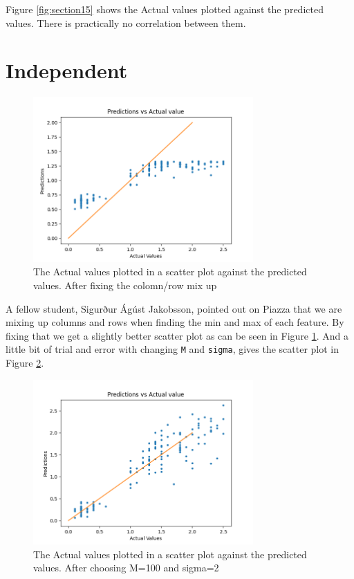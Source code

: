 \documentclass{article}
\begin{document}
Figure \ref{fig:section15} shows the Actual values plotted against the predicted values. There is practically no correlation between them. 

\section*{Independent}
\begin{figure}[H]
    \centering
    \includegraphics[width=0.75\textwidth]{07_linear_models/plot_1_5_fixi.png}
    \caption{The Actual values plotted in a scatter plot against the predicted values. After fixing the colomn/row mix up}
    \label{fig:fixi}
\end{figure}
A fellow student, Sigurður Ágúst Jakobsson, pointed out on Piazza that we are mixing up columns and rows when finding the min and max of each feature. By fixing that we get a slightly better scatter plot as can be seen in Figure \ref{fig:fixi}. And a little bit of trial and error with changing \verb!M! and \verb!sigma!, gives the scatter plot in Figure \ref{fig:m100s2}.
\begin{figure}[H]
    \centering
    \includegraphics[width=0.75\textwidth]{07_linear_models/plot_1_5.png}
    \caption{The Actual values plotted in a scatter plot against the predicted values. After choosing M=100 and sigma=2}
    \label{fig:m100s2}
\end{figure}
\end{document}
